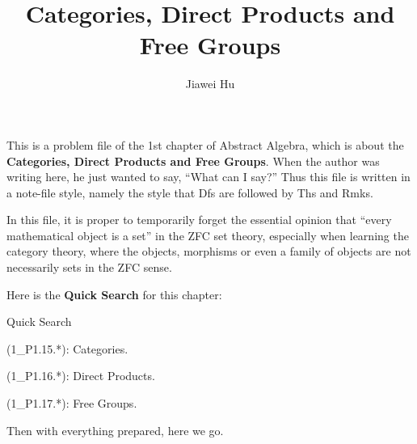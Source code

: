 \documentclass{article}
\title{\LARGE \textbf{Categories, Direct Products and Free Groups}}
\author{\large Jiawei Hu}
\begin{document}
\maketitle

This is a problem file of the 1st chapter of Abstract Algebra, which is about the \textbf{Categories, Direct Products and Free Groups}. When the author was writing here, he just wanted to say, ``What can I say?'' Thus this file is written in a note-file style, namely the style that Dfs are followed by Ths and Rmks.

In this file, it is proper to temporarily forget the essential opinion that ``every mathematical object is a set'' in the ZFC set theory, especially when learning the category theory, where the objects, morphisms or even a family of objects are not necessarily sets in the ZFC sense. 

Here is the \textbf{Quick Search} for this chapter:
\begin{Th}{Quick Search}
    \begin{compactdesc}
        \item (1\_P1.15.*): Categories.
        \item (1\_P1.16.*): Direct Products.
        \item (1\_P1.17.*): Free Groups.
    \end{compactdesc}
\end{Th}

Then with everything prepared, here we go. 
\end{document}
